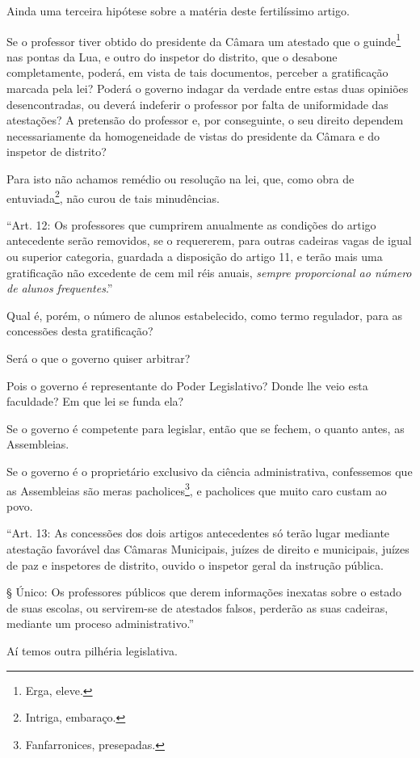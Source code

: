 Ainda uma terceira hipótese sobre a matéria deste fertilíssimo artigo.

Se o professor tiver obtido do presidente da Câmara um atestado que o
guinde\footnote{Erga, eleve.} nas pontas da Lua, e outro do inspetor
do distrito, que o desabone completamente, poderá, em vista de tais
documentos, perceber a gratificação marcada pela lei? Poderá o governo
indagar da verdade entre estas duas opiniões desencontradas, ou deverá
indeferir o professor por falta de uniformidade das atestações? A
pretensão do professor e, por conseguinte, o seu direito dependem
necessariamente da homogeneidade de vistas do presidente da Câmara e do
inspetor de distrito?

Para isto não achamos remédio ou resolução na lei, que, como obra de
entuviada\footnote{Intriga, embaraço.}, não curou de tais minudências.

``Art. 12: Os professores que cumprirem anualmente as condições do artigo
antecedente serão removidos, se o requererem, para outras cadeiras vagas
de igual ou superior categoria, guardada a disposição do artigo 11, e
terão mais uma gratificação não excedente de cem mil réis anuais,
\emph{sempre proporcional ao número de alunos frequentes}.''

Qual é, porém, o número de alunos estabelecido, como termo regulador,
para as concessões desta gratificação?

Será o que o governo quiser arbitrar?

Pois o governo é representante do Poder Legislativo? Donde lhe veio esta
faculdade? Em que lei se funda ela?

Se o governo é competente para legislar, então que se fechem, o quanto
antes, as Assembleias.

Se o governo é o proprietário exclusivo da ciência administrativa,
confessemos que as Assembleias são meras pacholices\footnote{
  Fanfarronices, presepadas.}, e pacholices que muito caro custam ao
povo.

``Art. 13: As concessões dos dois artigos antecedentes só terão lugar
mediante atestação favorável das Câmaras Municipais, juízes de direito e
municipais, juízes de paz e inspetores de distrito, ouvido o inspetor
geral da instrução pública.

§ Único: Os professores públicos que derem informações inexatas sobre o
estado de suas escolas, ou servirem-se de atestados falsos, perderão as
suas cadeiras, mediante um proceso administrativo.''

Aí temos outra pilhéria legislativa.

